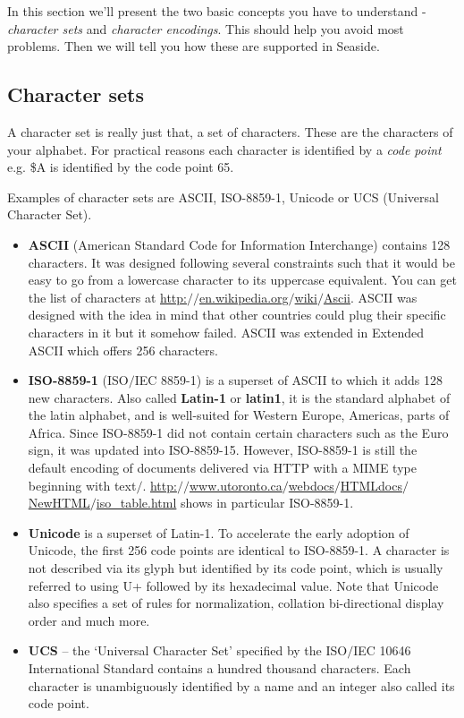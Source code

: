 \documentclass[a4paper,10pt,twoside]{book}
\begin{document}
In this section we'll present the two basic concepts you have to understand -\textit{ character sets} and \textit{character encodings}. This should help you avoid most problems. Then we will tell you how these are supported in Seaside.

\subsection{Character sets}
\label{book:inaction:servingfiles:characterencodings:charactersets}

A character set is really just that, a set of characters. These are the characters of your alphabet. For practical reasons each character is identified by a \textit{code point} e.g. \$A is identified by the code point 65.

Examples of character sets are ASCII, ISO-8859-1, Unicode or UCS (Universal Character Set).

\begin{itemize}
\item  \textbf{ASCII} (American Standard Code for Information Interchange) contains 128 characters. It was designed following several constraints such that it would be easy to go from a lowercase character to its uppercase equivalent. You can get the list of characters at \href{http://en.wikipedia.org/wiki/Ascii}{http:$/$$/$en.wikipedia.org$/$wiki$/$Ascii}. ASCII was designed with the idea in mind that other countries could plug their specific characters in it but it somehow failed. ASCII was extended in Extended ASCII which offers 256 characters.
\item  \textbf{ISO-8859-1} (ISO$/$IEC 8859-1) is a superset of ASCII to which it adds 128 new characters. Also called \textbf{Latin-1} or \textbf{latin1}, it is the standard alphabet of the latin alphabet, and is well-suited for Western Europe, Americas, parts of Africa. Since ISO-8859-1 did not contain certain characters such as the Euro sign, it was updated into ISO-8859-15. However, ISO-8859-1 is still the default encoding of documents delivered via HTTP with a MIME type beginning with text$/$. \href{http://www.utoronto.ca/webdocs/HTMLdocs/NewHTML/iso_table.html}{http:$/$$/$www.utoronto.ca$/$webdocs$/$HTMLdocs$/$NewHTML$/$iso\_table.html} shows in particular ISO-8859-1.
\item  \textbf{Unicode} is a superset of Latin-1. To accelerate the early adoption of Unicode, the first 256 code points are identical to ISO-8859-1. A character is not described via its glyph but identified by its code point, which is usually referred to using U+ followed by its hexadecimal value. Note that Unicode also specifies a set of rules for normalization, collation bi-directional display order and much more.
\item  \textbf{UCS} -- the `Universal Character Set' specified by the ISO$/$IEC 10646 International Standard contains a hundred thousand characters. Each character is unambiguously identified by a name and an integer also called its code point.
\end{itemize}
\end{document}
